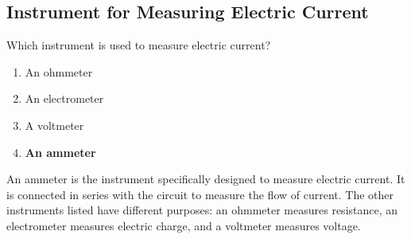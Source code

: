 \subsection{Instrument for Measuring Electric Current}
\label{T7D04}

\begin{tcolorbox}[colback=gray!10!white,colframe=black!75!black,title=T7D04]
Which instrument is used to measure electric current?
\begin{enumerate}[noitemsep]
    \item An ohmmeter
    \item An electrometer
    \item A voltmeter
    \item \textbf{An ammeter}
\end{enumerate}
\end{tcolorbox}

An ammeter is the instrument specifically designed to measure electric current. It is connected in series with the circuit to measure the flow of current. The other instruments listed have different purposes: an ohmmeter measures resistance, an electrometer measures electric charge, and a voltmeter measures voltage.